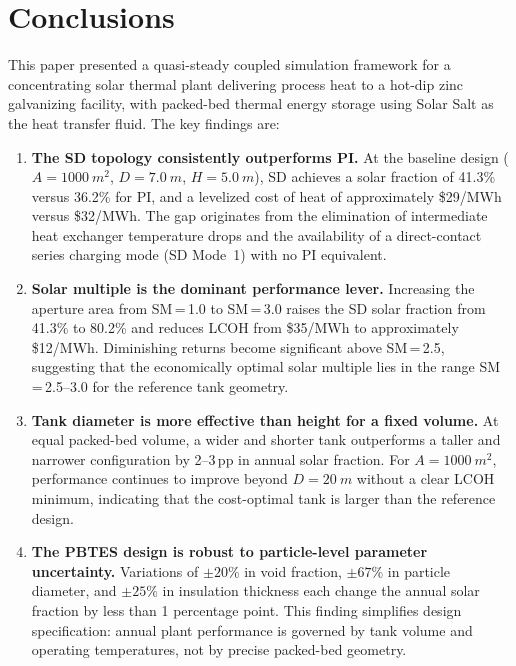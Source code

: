 \documentclass[11pt,review,3p]{elsarticle}
\begin{document}
\section{Conclusions}
\label{sec:Conclusions}


This paper presented a quasi-steady coupled simulation framework for a concentrating solar thermal plant delivering process heat to a hot-dip zinc galvanizing facility, with packed-bed thermal energy storage using Solar Salt as the heat transfer fluid. The key findings are:

\begin{enumerate}[leftmargin=*, itemsep=3pt]
    \item \textbf{The SD topology consistently outperforms PI.} At the baseline design ($A = \SI{1000}{m^2}$, $D = \SI{7.0}{m}$, $H = \SI{5.0}{m}$), SD achieves a solar fraction of 41.3\% versus 36.2\% for PI, and a levelized cost of heat of approximately \$29/MWh versus \$32/MWh. The gap originates from the elimination of intermediate heat exchanger temperature drops and the availability of a direct-contact series charging mode (SD Mode~1) with no PI equivalent.

    \item \textbf{Solar multiple is the dominant performance lever.} Increasing the aperture area from SM\,=\,1.0 to SM\,=\,3.0 raises the SD solar fraction from 41.3\% to 80.2\% and reduces LCOH from \$35/MWh to approximately \$12/MWh. Diminishing returns become significant above SM\,=\,2.5, suggesting that the economically optimal solar multiple lies in the range SM\,=\,2.5--3.0 for the reference tank geometry.

    \item \textbf{Tank diameter is more effective than height for a fixed volume.} At equal packed-bed volume, a wider and shorter tank outperforms a taller and narrower configuration by 2--3\,pp in annual solar fraction. For $A = \SI{1000}{m^2}$, performance continues to improve beyond $D = \SI{20}{m}$ without a clear LCOH minimum, indicating that the cost-optimal tank is larger than the reference design.

    \item \textbf{The PBTES design is robust to particle-level parameter uncertainty.} Variations of $\pm 20\%$ in void fraction, $\pm 67\%$ in particle diameter, and $\pm 25\%$ in insulation thickness each change the annual solar fraction by less than 1 percentage point. This finding simplifies design specification: annual plant performance is governed by tank volume and operating temperatures, not by precise packed-bed geometry.


\end{enumerate}
\end{document}
